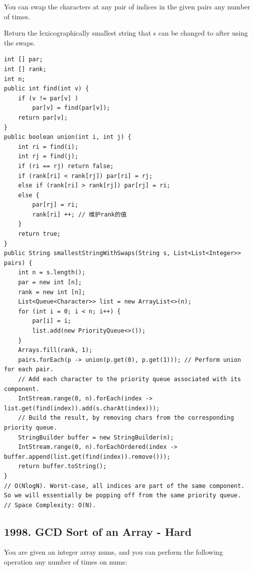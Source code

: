 \documentclass[9pt, b5paper]{article}
\begin{document}
You can swap the characters at any pair of indices in the given pairs any number of times.

Return the lexicographically smallest string that s can be changed to after using the swaps.
\begin{verbatim}
int [] par;
int [] rank;
int n;
public int find(int v) {
    if (v != par[v] ) 
        par[v] = find(par[v]);
    return par[v];
}
public boolean union(int i, int j) {
    int ri = find(i);
    int rj = find(j);
    if (ri == rj) return false;
    if (rank[ri] < rank[rj]) par[ri] = rj;
    else if (rank[ri] > rank[rj]) par[rj] = ri;
    else {
        par[rj] = ri;
        rank[ri] ++; // 维护rank的值
    }
    return true;
}
public String smallestStringWithSwaps(String s, List<List<Integer>> pairs) {
    int n = s.length();
    par = new int [n];
    rank = new int [n];
    List<Queue<Character>> list = new ArrayList<>(n);
    for (int i = 0; i < n; i++) {
        par[i] = i;
        list.add(new PriorityQueue<>());
    }
    Arrays.fill(rank, 1);
    pairs.forEach(p -> union(p.get(0), p.get(1))); // Perform union for each pair.
    // Add each character to the priority queue associated with its component.
    IntStream.range(0, n).forEach(index -> list.get(find(index)).add(s.charAt(index)));
    // Build the result, by removing chars from the corresponding priority queue.
    StringBuilder buffer = new StringBuilder(n);
    IntStream.range(0, n).forEachOrdered(index -> buffer.append(list.get(find(index)).remove()));
    return buffer.toString();
}
// O(NlogN). Worst-case, all indices are part of the same component. So we will essentially be popping off from the same priority queue.
// Space Complexity: O(N).
\end{verbatim}

\subsection{1998. GCD Sort of an Array - Hard}
\label{sec-11-5}
You are given an integer array nums, and you can perform the following operation any number of times on nums:
\end{document}
